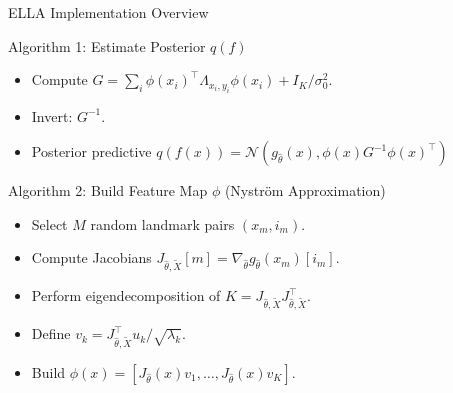 \documentclass{beamer}
\begin{document}
\begin{frame}{ELLA Implementation Overview}


\begin{block}{Algorithm 1: Estimate Posterior $q(f)$}
\begin{itemize}
    \item Compute $G = \sum_i \phi(x_i)^\top \Lambda_{x_i, y_i}\phi(x_i) + I_K/\sigma_0^2$.
    \item Invert: $G^{-1}$.
    \item Posterior predictive $q(f(x)) = \mathcal{N}(g_{\hat{\theta}}(x), \phi(x)G^{-1}\phi(x)^\top)$
\end{itemize}
\end{block}

\begin{block}{Algorithm 2: Build Feature Map $\phi$ (Nyström Approximation)}
\begin{itemize}
    \item Select $M$ random landmark pairs $(x_m, i_m)$.
    \item Compute Jacobians $J_{\hat{\theta}, \widetilde{X}}[m] = \nabla_{\hat{\theta}} g_{\hat{\theta}}(x_m)[i_m]$.
    \item Perform eigendecomposition of $K = J_{\hat{\theta}, \widetilde{X}} J_{\hat{\theta}, \widetilde{X}}^\top$.
    \item Define $v_k = J_{\hat{\theta}, \widetilde{X}}^\top u_k / \sqrt{\lambda_k}$.
    \item Build $\phi(x) = [J_{\hat{\theta}}(x)v_1, \dots, J_{\hat{\theta}}(x)v_K]$.
\end{itemize}
\end{block}

\end{frame}




\end{document}
